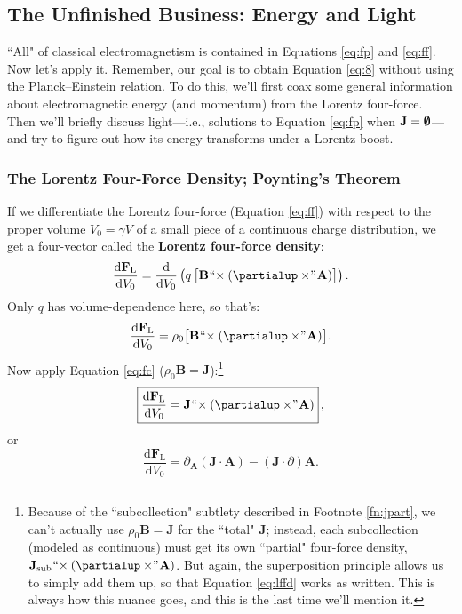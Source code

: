 \documentclass[12pt]{article}
\renewcommand{\vv}[1]{\mathbf{#1}}
\newcommand{\dd}[1]{\mathrm{d}#1}
\begin{document}
\subsection{The Unfinished Business: Energy and Light}

``All" of classical electromagnetism is contained in Equations \ref{eq:fp} and \ref{eq:ff}. Now let's apply it. Remember, our goal is to obtain Equation \ref{eq:8} without using the Planck--Einstein relation. To do this, we'll first coax some general information about electromagnetic energy (and momentum) from the Lorentz four-force. Then we'll briefly discuss light---i.e., solutions to Equation \ref{eq:fp} when $\vv J = \textrm{\mbox{\boldmath $\emptyset$}}$---and try to figure out how its energy transforms under a Lorentz boost.

\subsubsection{The Lorentz Four-Force Density; Poynting's Theorem}\label{sssec:lffd}

If we differentiate the Lorentz four-force (Equation \ref{eq:ff}) with respect to the proper volume ${V_0 = \gamma V}$ of a small piece of a continuous charge distribution, we get a four-vector called the \textbf{Lorentz four-force density}:
\begin{equation*}
\dfrac{\dd \vv F_{\mathrm{L}}}{\dd V_0} = \dfrac{\dd}{\dd V_0} \left( q \, \bigl[ \vv B \mkern1mu `` \mkern-4mu \times (\partialup \times \mkern-4mu " \mkern1mu \vv A) \bigr]  \right) .
\end{equation*}
Only $q$ has volume-dependence here, so that's:
\begin{equation*}
\dfrac{\dd \vv F_{\mathrm{L}}}{\dd V_0} = \rho_0 \bigl[ \vv B \mkern1mu `` \mkern-4mu \times (\partialup \times \mkern-4mu " \mkern1mu \vv A) \bigr] .
\end{equation*}
Now apply Equation \ref{eq:fc} ($\rho_0 \vv B = \vv J$):\footnote{Because of the ``subcollection" subtlety described in Footnote \ref{fn:jpart}, we can't actually use ${\rho_0 \vv B = \vv J}$ for the ``total" $\vv J$; instead, each subcollection (modeled as continuous) must get its own ``partial" four-force density, $\vv J_{\mathrm{sub}} \mkern1mu `` \mkern-4mu \times (\partialup \times \mkern-4mu " \mkern1mu \vv A)$. But again, the superposition principle allows us to simply add them up, so that Equation \ref{eq:lffd} works as written. This is always how this nuance goes, and this is the last time we'll mention it.}
\begin{equation}\label{eq:lffd}
\boxed{ \dfrac{\dd \vv F_{\mathrm{L}}}{\dd V_0} = \vv J \mkern1mu `` \mkern-4mu \times (\partialup \times \mkern-4mu " \mkern1mu \vv A) } \, ,
\end{equation}
or
\begin{equation*}
\dfrac{\dd \vv F_{\mathrm{L}}}{\dd V_0} = \partialup_{\vv A} (\vv J \cdot \vv A) - ( \vv J \cdot \partialup) \vv A .
\end{equation*}
\end{document}
